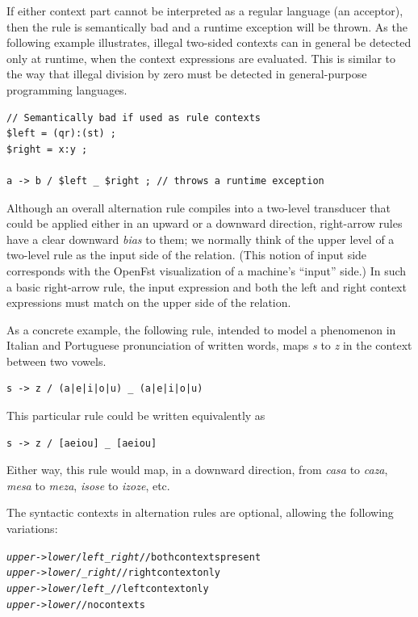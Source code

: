 \noindent
If either context part cannot be interpreted as a regular language (an acceptor), then the rule is semantically bad and
a runtime exception will be thrown.  As the following example illustrates, illegal two-sided contexts can in general be detected
only at runtime, when the context expressions are evaluated.  This is similar to the way that illegal division by zero
must be detected in general-purpose programming languages.

\begin{Verbatim}
// Semantically bad if used as rule contexts
$left = (qr):(st) ;
$right = x:y ;

a -> b / $left _ $right ; // throws a runtime exception
\end{Verbatim}


Although an overall alternation rule compiles into a two-level transducer that could be applied either in an
upward or a downward direction, right-arrow rules have a clear downward \emph{bias} to them;
we normally think of the upper level of a two-level rule as the input side of the
relation.  (This notion of input side corresponds with the OpenFst visualization of a
machine's ``input'' side.)
In such a basic right-arrow rule, the input expression and both the left
and right context expressions must match on the upper side of the relation.

As a concrete example, the following rule, intended to model a phenomenon in Italian and Portuguese
pronunciation of written words, maps \emph{s} to \emph{z} in the context between two vowels.


\begin{Verbatim}
s -> z / (a|e|i|o|u) _ (a|e|i|o|u)
\end{Verbatim}

\noindent
This particular rule could be written equivalently as


\begin{Verbatim}
s -> z / [aeiou] _ [aeiou]
\end{Verbatim}

\noindent
Either way, this rule would map, in a downward direction, from \emph{casa} to \emph{caza}, \emph{mesa} to \emph{meza},
\emph{isose} to \emph{izoze}, etc.

The syntactic contexts in alternation rules are optional, allowing the following variations:

\begin{alltt}
\emph{upper} -> \emph{lower} /   \emph{left} _ \emph{right} // both contexts present
\emph{upper} -> \emph{lower} /   _ \emph{right}      // right context only
\emph{upper} -> \emph{lower} /   \emph{left} _      // left context only
\emph{upper} -> \emph{lower}                  // no contexts
\end{alltt}

